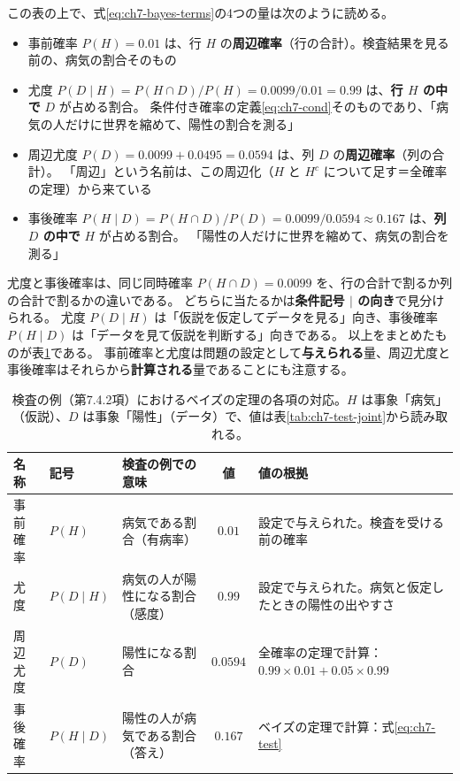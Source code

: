 この表の上で、式\eqref{eq:ch7-bayes-terms}の4つの量は次のように読める。
\begin{itemize}
  \item 事前確率 $P(H) = 0.01$ は、行 $H$ の\textbf{周辺確率}（行の合計）。検査結果を見る前の、病気の割合そのもの
  \item 尤度 $P(D \mid H) = P(H \cap D) / P(H) = 0.0099 / 0.01 = 0.99$ は、\textbf{行 $H$ の中で} $D$ が占める割合。
    条件付き確率の定義\eqref{eq:ch7-cond}そのものであり、「病気の人だけに世界を縮めて、陽性の割合を測る」
  \item 周辺尤度 $P(D) = 0.0099 + 0.0495 = 0.0594$ は、列 $D$ の\textbf{周辺確率}（列の合計）。
    「周辺」という名前は、この周辺化（$H$ と $H^c$ について足す＝全確率の定理）から来ている
  \item 事後確率 $P(H \mid D) = P(H \cap D) / P(D) = 0.0099 / 0.0594 \approx 0.167$ は、\textbf{列 $D$ の中で} $H$ が占める割合。
    「陽性の人だけに世界を縮めて、病気の割合を測る」
\end{itemize}
尤度と事後確率は、同じ同時確率 $P(H \cap D) = 0.0099$ を、行の合計で割るか列の合計で割るかの違いである。
どちらに当たるかは\textbf{条件記号 $\mid$ の向き}で見分けられる。
尤度 $P(D \mid H)$ は「仮説を仮定してデータを見る」向き、事後確率 $P(H \mid D)$ は「データを見て仮説を判断する」向きである。
以上をまとめたものが表\ref{tab:ch7-bayes-terms}である。
事前確率と尤度は問題の設定として\textbf{与えられる}量、周辺尤度と事後確率はそれらから\textbf{計算される}量であることにも注意する。

\begin{table}[tbp]
  \centering
  \caption{検査の例（第7.4.2項）におけるベイズの定理の各項の対応。$H$ は事象「病気」（仮説）、$D$ は事象「陽性」（データ）で、値は表\ref{tab:ch7-test-joint}から読み取れる。}
  \label{tab:ch7-bayes-terms}
  \small
  \begin{tabular}{l|l|l|c|p{4.6cm}}
    \hline
    名称 & 記号 & 検査の例での意味 & 値 & 値の根拠 \\
    \hline\hline
    事前確率 & $P(H)$ & 病気である割合（有病率） & $0.01$ & 設定で与えられた。検査を受ける前の確率 \\
    尤度 & $P(D \mid H)$ & 病気の人が陽性になる割合（感度） & $0.99$ & 設定で与えられた。病気と仮定したときの陽性の出やすさ \\
    周辺尤度 & $P(D)$ & 陽性になる割合 & $0.0594$ & 全確率の定理で計算：$0.99 \times 0.01 + 0.05 \times 0.99$ \\
    事後確率 & $P(H \mid D)$ & 陽性の人が病気である割合（答え） & $0.167$ & ベイズの定理で計算：式\eqref{eq:ch7-test} \\
    \hline
  \end{tabular}
\end{table}

